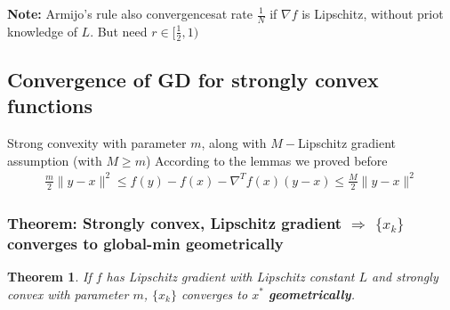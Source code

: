 \documentclass[11pt,a4paper]{article}
\newtheorem{theorem}{Theorem}
\begin{document}
\textbf{Note: }Armijo's rule also convergencesat rate $\frac{1}{N}$ if $\nabla f$ is Lipschitz, without priot knowledge of $L$. But need $r\in[\frac{1}{2},1)$


\subsection{Convergence of GD for strongly convex functions}
Strong convexity with parameter $m$, along with $M-$Lipschitz gradient assumption (with $M\geq m$)
According to the lemmas we proved before
\begin{equation}
    \begin{aligned}
        \frac{m}{2}\|y-x\|^2\leq f(y)-f(x)-\nabla^T f(x)(y-x)\leq \frac{M}{2}\|y-x\|^2
    \end{aligned}
    \nonumber
\end{equation}

\subsubsection{Theorem: Strongly convex, Lipschitz gradient $\Rightarrow$ $\{x_k\}$ converges to global-min geometrically}
\begin{theorem}
    If $f$ has Lipschitz gradient with Lipschitz constant $L$ and strongly convex with parameter $m$, $\{x_k\}$ converges to $x^*$ \textbf{geometrically}.
\end{theorem}
\end{document}
